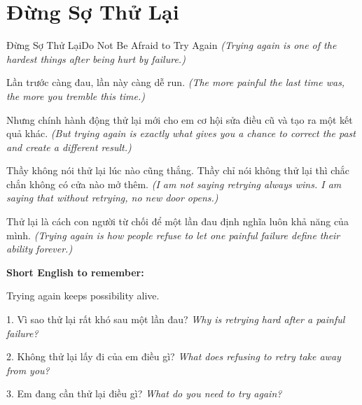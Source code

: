 \section{Đừng Sợ Thử Lại}
\begin{truyen}{Đừng Sợ Thử Lại}{Do Not Be Afraid to Try Again}
\textit{(Trying again is one of the hardest things after being hurt by failure.)}

Lần trước càng đau, lần này càng dễ run.
\textit{(The more painful the last time was, the more you tremble this time.)}

Nhưng chính hành động thử lại mới cho em cơ hội sửa điều cũ và tạo ra một kết quả khác.
\textit{(But trying again is exactly what gives you a chance to correct the past and create a different result.)}

Thầy không nói thử lại lúc nào cũng thắng. Thầy chỉ nói không thử lại thì chắc chắn không có cửa nào mở thêm.
\textit{(I am not saying retrying always wins. I am saying that without retrying, no new door opens.)}
\end{truyen}

\begin{baihoc}
Thử lại là cách con người từ chối để một lần đau định nghĩa luôn khả năng của mình.
\textit{(Trying again is how people refuse to let one painful failure define their ability forever.)}
\end{baihoc}

\begin{ghinhoanh}
\textbf{Short English to remember:}

Trying again keeps possibility alive.

\end{ghinhoanh}

\begin{tuhocnhanh}
1. Vì sao thử lại rất khó sau một lần đau? \textit{Why is retrying hard after a painful failure?}

2. Không thử lại lấy đi của em điều gì? \textit{What does refusing to retry take away from you?}

3. Em đang cần thử lại điều gì? \textit{What do you need to try again?}
\end{tuhocnhanh}
\ngancach


